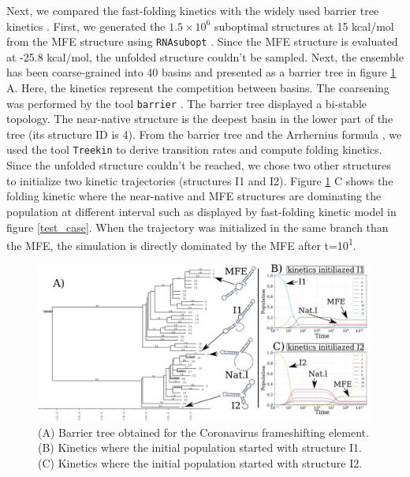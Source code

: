 \documentclass[a4paper,12pt]{article}
\begin{document}
Next, we compared the fast-folding kinetics with the widely used barrier tree
kinetics \cite{flamm02_barrier_trees_degen_lands}. First, we generated the \(1.5
\times 10^6\) suboptimal structures at 15 kcal/mol from the MFE structure using
\texttt{RNAsubopt} \cite{lorenz11_vienn_packag}. Since the MFE structure is evaluated at
-25.8 kcal/mol, the unfolded structure couldn't be sampled. Next, the ensemble
has been coarse-grained into 40 basins and presented as a barrier tree in figure
\ref{treekin} A. Here, the kinetics represent the competition between basins. The
coarsening was performed by the tool \texttt{barrier}
\cite{flamm02_barrier_trees_degen_lands}. The barrier tree displayed a bi-stable
topology. The near-native structure is the deepest basin in the lower part of
the tree (its structure ID is 4). From the barrier tree and the Arrhernius
formula \cite{wolfinger04_effic_comput_rna_foldin_dynam}, we used the tool
\texttt{Treekin} to derive transition rates and compute folding kinetics. Since the
unfolded structure couldn't be reached, we chose two other structures to
initialize two kinetic trajectories (structures I1 and I2). Figure \ref{treekin} C
shows the folding kinetic where the near-native and MFE structures are
dominating the population at different interval such as displayed by
fast-folding kinetic model in figure \ref{test_case}. When the trajectory was
initialized in the same branch than the MFE, the simulation is directly
dominated by the MFE after t=10\textsuperscript{1}.

\begin{figure}[h!]
\centering
\includegraphics[width=.9\linewidth]{img/kinetic_treekin/kinetic_treekin.png}
\caption{\label{treekin}(A) Barrier tree obtained for the Coronavirus frameshifting element. (B) Kinetics where the initial population started with structure I1. (C) Kinetics where the initial population started with structure I2.}
\end{figure}
\end{document}

